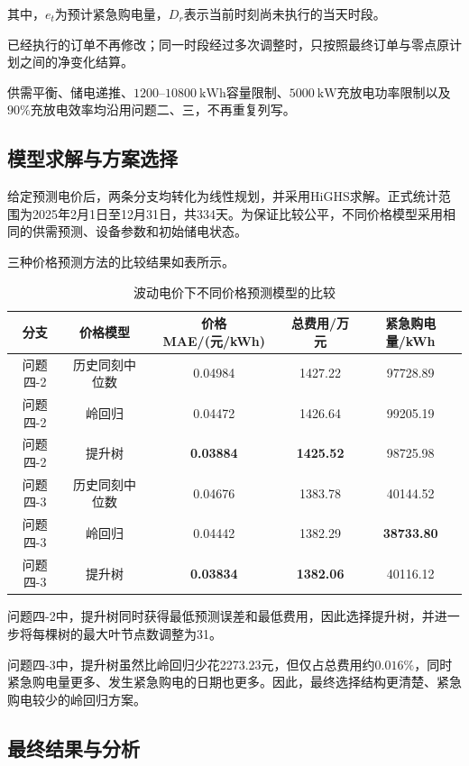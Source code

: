 其中，$e_t$为预计紧急购电量，$D_r$表示当前时刻尚未执行的当天时段。

已经执行的订单不再修改；同一时段经过多次调整时，只按照最终订单与零点原计划之间的净变化结算。

供需平衡、储电递推、$1200$--$10800\ \mathrm{kWh}$容量限制、$5000\ \mathrm{kW}$充放电功率限制以及$90\%$充放电效率均沿用问题二、三，不再重复列写。


\subsection{模型求解与方案选择}

给定预测电价后，两条分支均转化为线性规划，并采用HiGHS求解。正式统计范围为2025年2月1日至12月31日，共334天。为保证比较公平，不同价格模型采用相同的供需预测、设备参数和初始储电状态。

三种价格预测方法的比较结果如表所示。

\begin{table}[H]
    \centering
    \caption{波动电价下不同价格预测模型的比较}
    \begin{tabular}{ccccc}
        \hline
        分支 & 价格模型 & 价格MAE/(元/kWh) & 总费用/万元 & 紧急购电量/kWh \\
        \hline
        问题四-2 & 历史同刻中位数 & 0.04984 & 1427.22 & 97728.89 \\
        问题四-2 & 岭回归 & 0.04472 & 1426.64 & 99205.19 \\
        问题四-2 & 提升树 & \textbf{0.03884} & \textbf{1425.52} & 98725.98 \\
        \hline
        问题四-3 & 历史同刻中位数 & 0.04676 & 1383.78 & 40144.52 \\
        问题四-3 & 岭回归 & 0.04442 & 1382.29 & \textbf{38733.80} \\
        问题四-3 & 提升树 & \textbf{0.03834} & \textbf{1382.06} & 40116.12 \\
        \hline
    \end{tabular}
\end{table}

问题四-2中，提升树同时获得最低预测误差和最低费用，因此选择提升树，并进一步将每棵树的最大叶节点数调整为31。

问题四-3中，提升树虽然比岭回归少花2273.23元，但仅占总费用约$0.016\%$，同时紧急购电量更多、发生紧急购电的日期也更多。因此，最终选择结构更清楚、紧急购电较少的岭回归方案。


\subsection{最终结果与分析}

